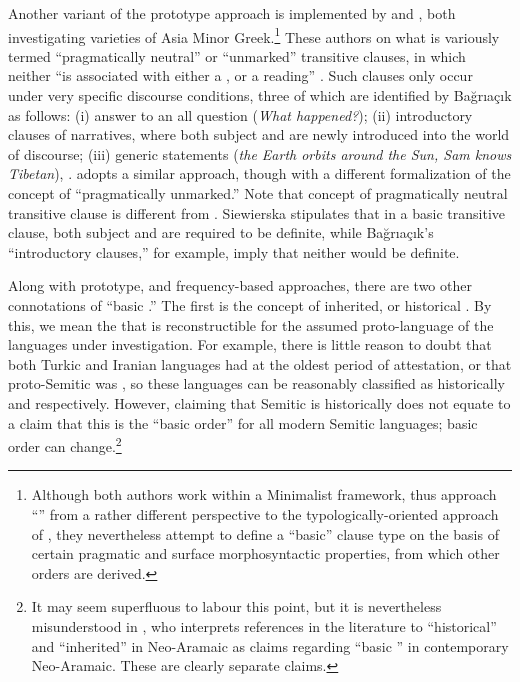 \documentclass[output=paper,colorlinks,citecolor=brown,collectionchapter]{langscibook}
\begin{document}
Another variant of the prototype approach is implemented by \citet{bagriacik_pharasiot_2018} and \citet{neocleous_word_2020}, both investigating varieties of Asia Minor Greek.\footnote{Although both authors work within a Minimalist framework, thus approach ``'' from a rather different perspective to the typologically-oriented approach of \citet{siewierska1988word}, they nevertheless attempt to define a ``basic'' clause type on the basis of certain pragmatic and surface morphosyntactic properties, from which other orders are derived.} These authors  on what is variously termed ``pragmatically neutral'' or ``unmarked'' transitive clauses, in which neither  ``is associated with either a , or a  reading'' \citep[150]{bagriacik_pharasiot_2018}. Such clauses only occur under very specific discourse conditions, three of which are identified by Bağrıaçık as follows: (i) answer to an all  question (\textit{What happened?}); (ii) introductory clauses of narratives, where both subject and  are newly introduced into the world of discourse; (iii) generic statements (\textit{the Earth orbits around the Sun, Sam knows Tibetan}), \citep[151--154]{bagriacik_pharasiot_2018}. \citet{neocleous_word_2020} adopts a similar approach, though with a different formalization of the concept of ``pragmatically unmarked.'' Note that \citet{bagriacik_pharasiot_2018} concept of pragmatically neutral transitive clause is different from . Siewierska stipulates that in a basic transitive clause, both subject and  are required to be definite, while Bağrıaçık's ``introductory clauses,'' for example, imply that neither would be definite.

Along with prototype, and frequency-based approaches, there are two other connotations of ``basic .'' The first is the concept of inherited, or historical . By this, we mean the  that is reconstructible for the assumed proto-language of the languages under investigation. For example, there is little reason to doubt that both Turkic and Iranian languages had   at the oldest period of attestation, or that proto-Semitic was , so these languages can be reasonably classified as historically  and  respectively. However, claiming that Semitic is historically  does not equate to a claim that this is the ``basic order'' for all modern Semitic languages; basic order can change.\footnote{It may seem superfluous to labour this point, but it is nevertheless misunderstood in \citet[42]{asadpour_typologizing_2022}, who interprets references in the literature to ``historical'' and ``inherited''  in Neo-Aramaic as claims regarding ``basic '' in contemporary Neo-Aramaic. These are clearly separate claims.}
\end{document}

